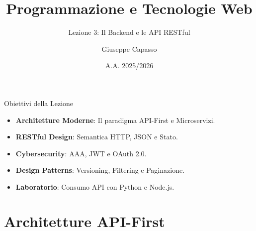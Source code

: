 \documentclass[10pt]{beamer}
\title[Backend e API]{Programmazione e Tecnologie Web}
\subtitle{Lezione 3: Il Backend e le API RESTful}
\author{Giuseppe Capasso}
\institute[ITS]{Istituto Tecnico Superiore (ITS)}
\date{A.A. 2025/2026}
\begin{document}
\begin{frame}
    \titlepage
\end{frame}

\begin{frame}{Obiettivi della Lezione}
    \begin{itemize}
        \item \textbf{Architetture Moderne}: Il paradigma API-First e Microservizi.
        \item \textbf{RESTful Design}: Semantica HTTP, JSON e Stato.
        \item \textbf{Cybersecurity}: AAA, JWT e OAuth 2.0.
        \item \textbf{Design Patterns}: Versioning, Filtering e Paginazione.
        \item \textbf{Laboratorio}: Consumo API con Python e Node.js.
    \end{itemize}
\end{frame}

\section{Architetture API-First}
\end{document}
